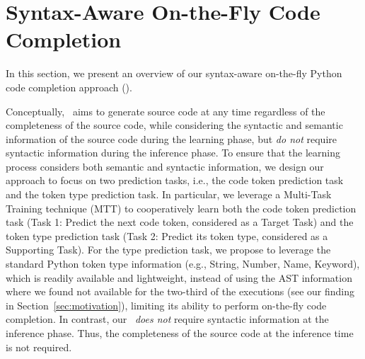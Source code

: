 \section{Syntax-Aware On-the-Fly Code Completion}\label{sec:approach}


In this section, we present an overview of our syntax-aware on-the-fly Python code completion approach (\our).

Conceptually, \our~aims to generate source code at any time regardless of the completeness of the source code, while considering the syntactic and semantic information of the source code during the learning phase, but \emph{do not} require syntactic information during the inference phase.
To ensure that the learning process considers both semantic and syntactic information, we design our approach to focus on two prediction tasks, i.e., the code token prediction task and the token type prediction task.
In particular, we leverage a Multi-Task Training technique (MTT) to cooperatively learn both the code token prediction task (Task 1: Predict the next code token, considered as a Target Task) and the token type prediction task (Task 2: Predict its token type, considered as a Supporting Task).
For the type prediction task, we propose to leverage the standard Python token type information (e.g., String, Number, Name, Keyword), which is readily available and lightweight, instead of using the AST information~\cite{kim2021code, izadi2022codefill, li2017code, svyatkovskiy2019pythia, liu2020self, liu2022unified} where we found not available for the two-third of the executions (see our finding in Section~\ref{sec:motivation}), limiting its ability to perform on-the-fly code completion.
In contrast, our \our~\emph{does not} require syntactic information at the inference phase.
Thus, the completeness of the source code at the inference time is not required.








